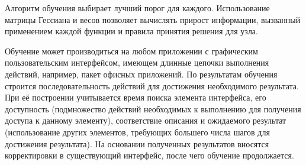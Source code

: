 Алгоритм обучения выбирает лучший порог для каждого. Использование матрицы Гессиана и весов позволяет вычислять прирост информации, вызванный применением каждой функции и правила принятия решения для узла.
	
Обучение может производиться на любом приложении с графическим пользовательским интерфейсом, имеющем длинные цепочки выполнения действий, например, пакет офисных приложений. По результатам обучения строится последовательность действий для достижения необходимого результата. При её построении учитывается время поиска элемента интерфейса, его доступность (подмножество действий необходимых к выполнению для получения доступа к данному элементу), соответствие описания и ожидаемого результат (использование других элементов, требующих большего числа шагов для достижения результата). На основании полученных результатов вносятся корректировки в существующий интерфейс, после чего обучение продолжается.
\noteattributes{}


